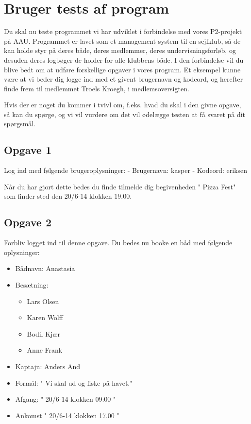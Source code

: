 \chapter{Bruger tests af program}\label{BrugerTestCases}

Du skal nu teste programmet vi har udviklet i forbindelse med vores P2-projekt på AAU. Programmet er lavet som et management system til en sejlklub, så de kan holde styr på deres både, deres medlemmer, deres undervisningsforløb, og desuden deres logbøger de holder for alle klubbens både. I den forbindelse vil du blive bedt om at udføre forskellige opgaver i vores program. Et eksempel kunne være at vi beder dig logge ind med et givent brugernavn og kodeord, og herefter finde frem til medlemmet Troels Kroegh, i medlemsoversigten.

Hvis der er noget du kommer i tvivl om, f.eks. hvad du skal i den givne opgave, så kan du spørge, og vi vil vurdere om det vil ødelægge testen at få svaret på dit spørgsmål.


\section{Opgave 1}

Log ind med følgende brugeroplysninger: 
\newline - Brugernavn: kasper
\newline - Kodeord: eriksen

Når du har gjort dette bedes du finde tilmelde dig begivenheden " Pizza Fest" som finder sted den 20/6-14  klokken 19.00.

\section{Opgave 2}

Forbliv logget ind til denne opgave. Du bedes nu booke en båd med følgende oplysninger:

\begin{itemize}
	\item Bådnavn: Anastasia
	\item Besætning: 
	\begin{itemize}
		\item Lars Olsen
		\item Karen Wolff
		\item Bodil Kjær
		\item Anne Frank
	\end{itemize}
	\item Kaptajn: Anders And
	\item Formål: " Vi skal ud og fiske på havet."
	\item Afgang: " 20/6-14 klokken 09:00 " 
	\item Ankomst " 20/6-14 klokken 17.00 "
\end{itemize}

